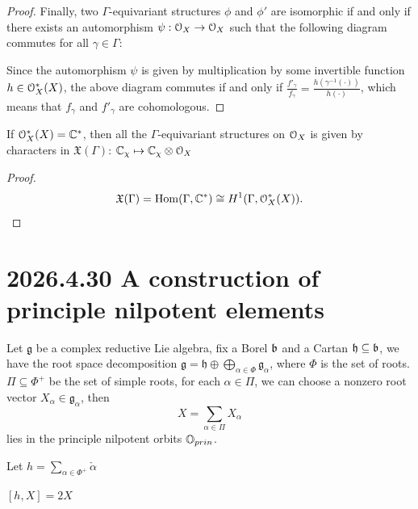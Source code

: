 \documentclass[12pt]{amsart}
\numberwithin{equation}{section}
\newcommand{\fg}{\mathfrak{g}} \newcommand{\fh}{\mathfrak{h}} \newcommand{\fk}{\mathfrak{k}}
\begin{document}
\begin{proof}
  Finally, two $\Gamma$-equivariant structures $\phi$ and $\phi'$ are isomorphic if and only if there exists an automorphism $\psi: {\mathcal {O}}_X \to {\mathcal {O}}_X$ such that the following diagram commutes for all $\gamma \in \Gamma$:
\begin{center}\end{center}
Since the automorphism $\psi$ is given by multiplication by some invertible function $h \in {\mathcal {O}}^{*}_X(X)$, the above diagram commutes if and only if $\frac{f'_{\gamma}}{f_{\gamma}} = \frac{h(\gamma^{-1}(\cdot))}{h(\cdot)}$, which means that $f_{\gamma}$ and $f'_{\gamma}$ are cohomologous.
\end{proof}

\begin{cor}
  If ${\mathcal {O}}^{*}_X(X) = {\mathbb {C}}^{*}$, then all the $\Gamma$-equivariant structures on ${\mathcal {O}}_X$ is given by characters in $\mathfrak{X}(\Gamma)$: ${\mathbb {C}}_{\chi} \mapsto {\mathbb {C}}_{\chi} \otimes {\mathcal {O}}_X$

\end{cor}



\begin{proof}
  \[
    \mathfrak{X}(\Gamma) = \mathrm{Hom}(\Gamma, {\mathbb {C}}^{*}) \cong H^1(\Gamma, {\mathcal {O}}^{*}_X(X)).
  \]
\end{proof}


\section{2026.4.30 A construction of principle nilpotent elements}

Let $\fg$ be a complex reductive Lie algebra, fix a Borel $\mathfrak{b}$ and a Cartan $\fh \subseteq \fb$, we have the root space decomposition $\fg = \fh \oplus \bigoplus_{\alpha \in \Phi} \fg_{\alpha}$, where $\Phi$ is the set of roots. $\Pi \subseteq \Phi^{+}$ be the set of simple roots, for each $\alpha \in \Pi$, we can choose a nonzero root vector $X_{\alpha} \in \fg_{\alpha}$, then
\[
  X = \sum_{\alpha \in \Pi} X_{\alpha}
\]
lies in the principle nilpotent orbits ${\mathbb {O}}_{prin}$.

Let $h = \sum_{\alpha \in \Phi^+} \check{\alpha}$

\begin{lem}
  $[h, X] = 2X$
\end{lem}
\end{document}
